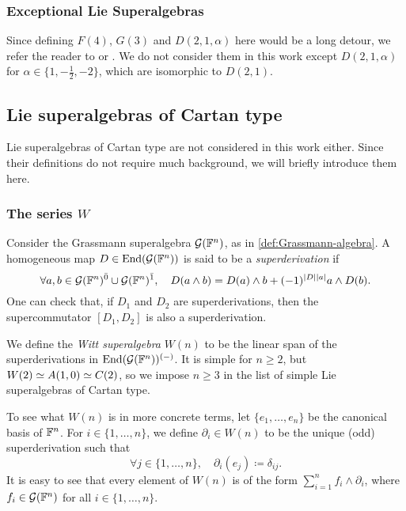 \subsubsection{Exceptional Lie Superalgebras} 

Since defining $F(4)$, $G(3)$ and $D(2,1, \alpha)$ here would be a long detour, we refer the reader to \cite{artigokac} or \cite{MR1773773}. 
We do not consider them in this work except $D(2, 1, \alpha)$ for $\alpha \in \{1, -\frac{1}{2}, -2 \}$, which are isomorphic to $D(2,1)$. 

\subsection{Lie superalgebras of Cartan type}\label{subsec:Cartan}

Lie superalgebras of Cartan type are not considered in this work either. 
Since their definitions do not require much background, we will briefly introduce them here.

\subsubsection{The series $W$}

Consider the Grassmann superalgebra $\mathcal G(\mathbb{F}^n)$, as in \cref{def:Grassmann-algebra}. 
A homogeneous map $D\in \operatorname{End}(\mathcal G(\mathbb{F}^n))$ is said to be a \emph{superderivation} if 
\[
    \forall a,b \in \mathcal G(\mathbb{F}^n)^{\bar0} \cup \mathcal G(\mathbb{F}^n)^{\bar1}, \quad 
    D (a\wedge b)= D (a)\wedge b + (-1)^{|D||a|} a\wedge D (b).
\]
One can check that, if $D_1$ and $D_2$ are superderivations, then the supercommutator $[D_1, D_2]$ is also a superderivation. 

We define the \emph{Witt superalgebra} $W(n)$ to be the linear span of the superderivations in $\operatorname{End}(\mathcal G(\mathbb{F}^n))^{(-)}$. 
It is simple for $n\geq 2$, but $W(2)\simeq A(1,0)\simeq C(2)$, so we impose $n\geq 3$ in the list of simple Lie superalgebras of Cartan type. 

To see what $W(n)$ is in more concrete terms, let $\{e_1,\ldots,e_n\}$ be the canonical basis of $\mathbb{F}^n$. 
For $i\in \{1, \ldots ,n\}$, we define $\partial_i \in W(n)$ to be the unique (odd) superderivation such that 
\[
    \forall j\in \{1,\ldots ,n\}, \quad 
    \partial_i (e_j) \coloneqq  \delta_{ij}.
\]
It is easy to see that every element of $W(n)$ is of the form $\sum_{i=1}^{n} f_i \wedge \partial_i$, where $f_i \in \mathcal G(\mathbb{F}^n)$ for all $i\in\{1, \ldots , n\}$.

